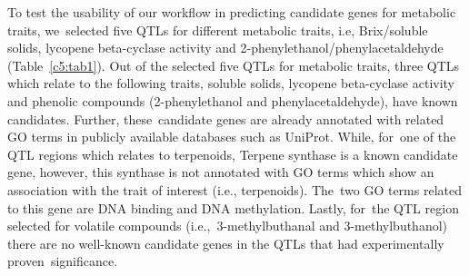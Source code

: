 \documentclass[applsci,article,accept,moreauthors,pdftex]{Definitions/mdpi}
\begin{document}
{To test the usability of our workflow in predicting candidate genes for metabolic traits, we~selected five QTLs %
for different metabolic traits, i.e, %
Brix/soluble solids, lycopene beta-cyclase activity and 2-phenylethanol/phenylacetaldehyde %
(Table~\ref{c5:tab1}). %
Out of the selected five QTLs for metabolic traits, three QTLs %
which relate to the following traits, soluble solids, lycopene beta-cyclase activity and phenolic compounds (2-phenylethanol and %
phenylacetaldehyde), have known candidates.
Further, these~candidate genes are already annotated with related GO terms in publicly %
available databases such as UniProt. %
While, for~one of the QTL regions which relates to terpenoids, Terpene synthase is a known candidate gene, however, this %
synthase is not annotated with GO terms which show an association with the trait of interest (i.e., terpenoids).
The~two GO terms %
related to this gene are DNA binding and DNA methylation. Lastly, for~the QTL region selected for volatile compounds (i.e.,~3-methylbuthanal and 3-methylbuthanol) %
there are no well-known candidate genes in the QTLs that had experimentally proven~significance.

}
\end{document}
